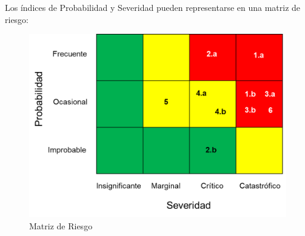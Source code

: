 \documentclass{article}
\begin{document}
Los índices de Probabilidad y Severidad pueden representarse en una matriz de riesgo:
\begin{figure}[H]
\begin{center}
\includegraphics[width=0.5\paperwidth,keepaspectratio]{matriz_riesgo.png}
\end{center}
\caption{Matriz de Riesgo}
\end{figure}
\end{document}

